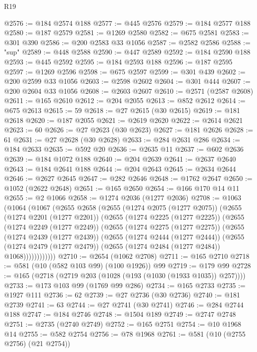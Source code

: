 \begin{lexlean}{R19}
\begin{coremodule}
@2576 := @184 @2574 @188
@2577 := @445 @2576
@2579 := @184 @2577 @188
@2580 := @187 @2579
@2581 := @1269 @2580
@2582 := @675 @2581
@2583 := @301 @390
@2586 := @200 @2583 @33 @1056
@2587 := @2582 @2586
@2588 := "sup"
@2589 := @448 @2588
@2590 := @447 @2589
@2592 := @184 @2590 @188
@2593 := @445 @2592
@2595 := @184 @2593 @188
@2596 := @187 @2595
@2597 := @1269 @2596
@2598 := @675 @2597
@2599 := @301 @439
@2602 := @200 @2599 @33 @1056
@2603 := @2598 @2602
@2604 := @301 @444
@2607 := @200 @2604 @33 @1056
@2608 := @2603 @2607
@2610 := @2571 (@2587 @2608)
@2611 := @165 @2610
@2612 := @204 @2055
@2613 := @852 @2612
@2614 := @675 @2613
@2615 := 59
@2618 := @27 @2615 (@30 @2615)
@2619 := @181 @2618
@2620 := @187 @2055
@2621 := @2619 @2620
@2622 := @2614 @2621
@2623 := 60
@2626 := @27 @2623 (@30 @2623)
@2627 := @181 @2626
@2628 := 61
@2631 := @27 @2628 (@30 @2628)
@2633 := @284 @2631 @286
@2634 := @184 @2633
@2635 := @592 @20
@2636 := @2635 @11
@2637 := @602 @2636
@2639 := @184 @1072 @188
@2640 := @204 @2639
@2641 := @2637 @2640
@2643 := @184 @2641 @188
@2644 := @204 @2643
@2645 := @2634 @2644
@2646 := @2627 @2645
@2647 := @282 @2646
@2648 := @1762 @2647
@2650 := @1052 (@2622 @2648)
@2651 := @165 @2650
@2654 := @166 @170 @14 @11
@2655 := @2 @1066
@2658 := @1274 @2036 (@1277 @2036)
@2708 := @1063
    (@1064
      (@1067
        (@2655
          @2658
          (@2655
            (@1274 @2075 (@1277 @2075))
            (@2655
              (@1274 @2201 (@1277 @2201))
              (@2655
                (@1274 @2225 (@1277 @2225))
                (@2655
                  (@1274 @2249 (@1277 @2249))
                  (@2655
                    (@1274 @2275 (@1277 @2275))
                    (@2655
                      (@1274 @2439 (@1277 @2439))
                      (@2655
                        (@1274 @2444 (@1277 @2444))
                        (@2655
                          (@1274 @2479 (@1277 @2479))
                          (@2655 (@1274 @2484 (@1277 @2484)) @1068))))))))))))
@2710 := @2654 (@1062 @2708)
@2711 := @165 @2710
@2718 := @581 (@10 (@582 @103 @99) (@100 @1926)) @99
@2719 := @179 @99
@2728 := @165 (@2718 (@2719 @203 (@1028 (@193 (@1030 (@1933 @1035)) @257))))
@2733 := @173 @103 @99 (@1769 @99 @286)
@2734 := @165 @2733
@2735 := @1927 @111
@2736 := 62
@2739 := @27 @2736 (@30 @2736)
@2740 := @181 @2739
@2741 := 63
@2744 := @27 @2741 (@30 @2741)
@2746 := @284 @2744 @188
@2747 := @184 @2746
@2748 := @1504 @189
@2749 := @2747 @2748
@2751 := @2735 (@2740 @2749)
@2752 := @165 @2751
@2754 := @10 @1968 @14
@2755 := @582 @2754
@2756 := @78 @1968
@2761 := @581 (@10 (@2755 @2756) (@21 @2754))

\end{coremodule}
\end{lexlean}
